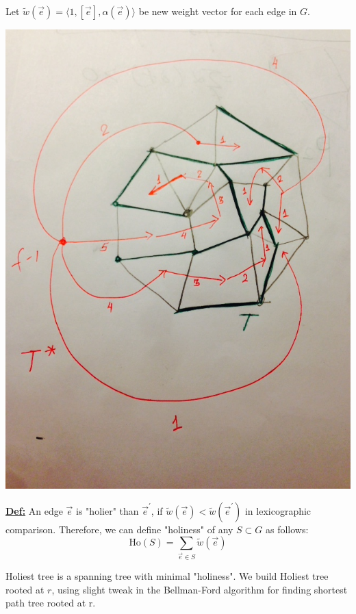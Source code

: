 \documentclass{article}
\begin{document}
Let $\tilde w(\vec{e}) = \langle 1, [\vec{e}], \alpha(\vec{e}) \rangle$ be new
weight vector for each edge in $G$.
\begin{center}
\includegraphics[scale = 0.3]{alphaDef.jpg}
\end{center}

\textbf{\underline{Def:}} An edge $\vec{e}$ is "holier" than $\vec{e}^{'}$, 
if $\tilde w(\vec{e}) < \tilde w(\vec{e}^{'})$ in lexicographic comparison. 
Therefore, we can define "holiness" of any $S \subset G $ as follows:
\[\text{Ho}(S) = \sum \limits_{\vec{e} \in S} \tilde w(\vec{e})\]



\newpage

Holiest tree is a spanning tree with minimal "holiness". We build Holiest tree 
rooted at $r$, using slight tweak in the Bellman-Ford algorithm for finding 
shortest path tree rooted at r. \\
\end{document}
